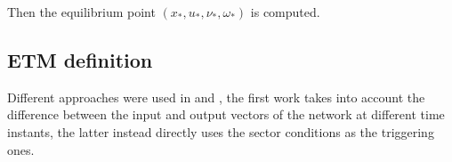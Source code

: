 \documentclass{article}
\begin{document}
Then the equilibrium point $\left( x_{*}, u_{*}, \nu_{*}, \omega_{*} \right)$ is computed.

\subsection*{ETM definition}
Different approaches were used in \cite{css-paper} and \cite{css-extended}, the first work takes into account the difference between the input and output vectors of the network at different time instants, the latter instead directly uses the sector conditions as the triggering ones.

\pagebreak
\nocite{*}
\printbibliography
\end{document}
